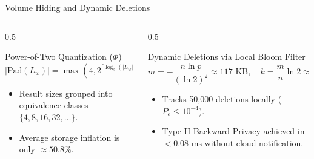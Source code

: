\documentclass[aspectratio=169]{beamer}
\begin{document}
\begin{frame}{Volume Hiding and Dynamic Deletions}
  \begin{columns}
    \begin{column}{0.5\textwidth}
      \begin{block}{Power-of-Two Quantization ($\Phi$)}
        $$|\text{Pad}(L_w)| = \max\left(4, 2^{\lceil \log_2(|L_w|) \rceil}\right)$$
        \begin{itemize}
          \item Result sizes grouped into equivalence classes $\{4, 8, 16, 32, \dots\}$.
          \item Average storage inflation is only \textbf{$\approx 50.8\%$}.
        \end{itemize}
      \end{block}
    \end{column}
    \begin{column}{0.5\textwidth}
      \begin{block}{Dynamic Deletions via Local Bloom Filter}
        $$m = -\frac{n \ln p}{(\ln 2)^2} \approx 117\text{ KB}, \quad k = \frac{m}{n}\ln 2 \approx 13$$
        \begin{itemize}
          \item Tracks 50,000 deletions locally ($P_e \le 10^{-4}$).
          \item Type-II Backward Privacy achieved in \textbf{$< 0.08\text{ ms}$} without cloud notification.
        \end{itemize}
      \end{block}
    \end{column}
  \end{columns}
\end{frame}
\end{document}
